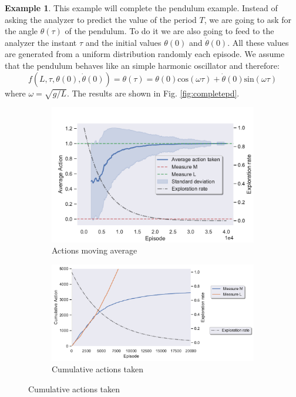\documentclass[11pt,a4paper,twoside]{report}
\newcommand{\+}{\textnormal{+} }
\theoremstyle{definition}
\newtheorem{myex}[mythm]{Example}
\numberwithin{equation}{chapter}
\begin{document}
  \begin{myex}\label{pendulumcomplete}
    This example will complete the pendulum example. Instead of asking the 
    analyzer to predict the value of the period $T$, we are going to ask for 
    the angle $\theta(\tau)$ of the pendulum. To do it we are also going
    to feed to the analyzer the instant $\tau$ and the initial values
    $\theta(0)$ and $\dot\theta(0)$. All these values are generated from a
    uniform distribution randomly each episode. We assume that the pendulum
    behaves like an simple harmonic oscillator and therefore:
    \begin{equation}
      f(L,\tau, \theta(0),\dot\theta(0))=\theta(\tau)=
      \theta(0)\text{cos}(\omega\tau)+ \dot\theta(0)\text{sin}(\omega\tau)
    \end{equation}
    where $\omega = \sqrt{g/L}$. The results are shown in Fig.
    \ref{fig:completepd}.

    \begin{figure}  %
      \begin{subfigure}{0.45\textwidth}
      \includegraphics[width=\linewidth]{figures/Action-MAB5.pdf}
      \caption{Actions moving average}
      \end{subfigure}
      \hfill %
      \begin{subfigure}{0.45\textwidth}
      \includegraphics[width=\linewidth]{figures/Cum-action-MAB5.pdf}
      \caption{Cumulative actions taken}
      \end{subfigure}
      

\end{figure}
\end{myex}
\end{document}
